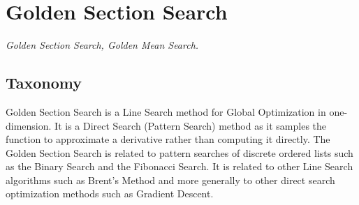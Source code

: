 
\section{Golden Section Search} 
\label{sec:golden_section_search}

\emph{Golden Section Search, Golden Mean Search.}

\subsection{Taxonomy}
Golden Section Search is a Line Search method for Global Optimization in one-dimension. It is a Direct Search (Pattern Search) method as it samples the function to approximate a derivative rather than computing it directly.
The Golden Section Search is related to pattern searches of discrete ordered lists such as the Binary Search and the  Fibonacci Search. It is related to other Line Search algorithms such as Brent's Method and more generally to other direct search optimization methods such as Gradient Descent.

